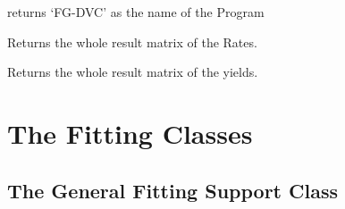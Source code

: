 \documentclass[letterpaper,10pt,english]{sphinxmanual}
\begin{document}
\begin{fulllineitems}
\begin{fulllineitems}
\end{fulllineitems}


\begin{fulllineitems}
\label{FGDVCClasses:FGDVC_Result.FGDVC_Result.Name}
returns `FG-DVC' as the name of the Program

\end{fulllineitems}


\begin{fulllineitems}
\label{FGDVCClasses:FGDVC_Result.FGDVC_Result.Rates_all}
Returns the whole result matrix of the Rates.

\end{fulllineitems}


\begin{fulllineitems}
\label{FGDVCClasses:FGDVC_Result.FGDVC_Result.Yields_all}
Returns the whole result matrix of the yields.

\end{fulllineitems}


\end{fulllineitems}



\chapter{The Fitting Classes}
\label{FittingClasses:the-fitting-classes}\label{FittingClasses::doc}

\section{The General Fitting Support Class}
\label{FittingClasses:the-general-fitting-support-class}
\end{document}
